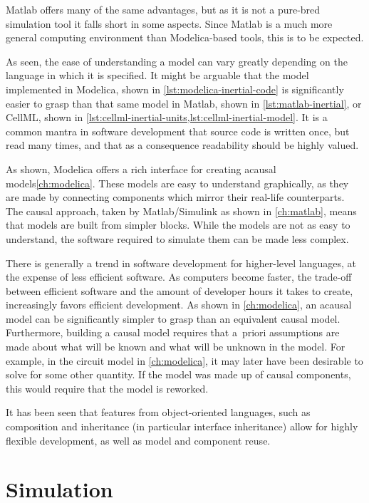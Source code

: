 \documentclass[\rootfolder/main.tex]{subfiles}
\begin{document}
Matlab offers many of the same advantages, but as it is not a pure-bred simulation tool it falls short in some aspects.
Since Matlab is a much more general computing environment than Modelica-based tools, this is to be expected.

As seen, the ease of understanding a model can vary greatly depending on the language in which it is specified.
It might be arguable that the model implemented in Modelica, shown in \cref{lst:modelica-inertial-code} is significantly easier to grasp than that same model in Matlab, shown in \cref{lst:matlab-inertial}, or CellML, shown in \cref{lst:cellml-inertial-units,lst:cellml-inertial-model}. 
It is a common mantra in software development that source code is written once, but read many times, and that as a consequence readability should be highly valued.

As shown, Modelica offers a rich interface for creating acausal models\cref{ch:modelica}.
These models are easy to understand graphically, as they are made by connecting components which mirror their real-life counterparts.
The causal approach, taken by Matlab/Simulink as shown in \cref{ch:matlab}, means that models are built from simpler blocks.
While the models are not as easy to understand, the software required to simulate them can be made less complex.

There is generally a trend in software development for higher-level languages, at the expense of less efficient software.
As computers become faster, the trade-off between efficient software and the amount of developer hours it takes to create, increasingly favors efficient development.
As shown in \cref{ch:modelica}, an acausal model can be significantly simpler to grasp than an equivalent causal model.
Furthermore, building a causal model requires that a~priori assumptions are made about what will be known and what will be unknown in the model.
For example, in the circuit model in \cref{ch:modelica}, it may later have been desirable to solve for some other quantity.
If the model was made up of causal components, this would require that the model is reworked.

It has been seen that features from object-oriented languages, such as composition and inheritance (in particular interface inheritance) allow for highly flexible development, as well as model and component reuse.

\section{Simulation}
\end{document}
